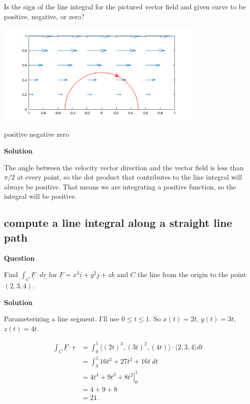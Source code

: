 \documentclass[12pt,letterpaper,noanswers]{exam}
\newcommand{\mb}[1]{\underline{#1}}
\begin{document}
Is the sign of the line integral for the pictured vector field and given curve to be positive, negative, or zero?

\includegraphics[width=4in]{img/C21lineintegral-p1.png}

\begin{oneparcheckboxes}
\choice positive
\choice negative
\choice zero
\end{oneparcheckboxes}

\noindent\textbf{Solution}

The angle between the velocity vector direction and the vector field is less than $\pi/2$ at every point, so the dot product that contributes to the line integral will always be positive.  That means we are integrating a positive function, so the integral will be positive.

\subsection{compute a line integral along a straight line path}
\noindent\textbf{Question}

Find $\displaystyle\int_C \mb F\cdot d\mb r$ for $\mb F = x^3\mb i + y^2\mb j + z\mb k$ and $C$ the line from the origin to the point $(2,3,4)$.




\noindent\textbf{Solution}

Parameterizing a line segment.  I'll use $0\leq t \leq 1$.  So $x(t) = 2t$, $y(t) = 3t$, $z(t) = 4t$.

\begin{align*}
\int_C \mb F \cdot \mb r &= \int_0^1 \langle (2t)^3, (3t)^2, (4t)\rangle \cdot \langle 2,3,4\rangle dt \\
&= \int_0^1 16t^3 + 27t^2 + 16t\ dt \\
& = \left. 4t^4 + 9t^3 + 8t^2 \right\vert_0^1 \\
& = 4 + 9 + 8 \\
&= 21.
\end{align*}
\end{document}
